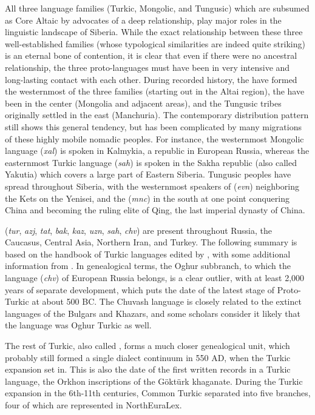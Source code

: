 All three language families (Turkic, Mongolic, and Tungusic) which are subsumed as Core Altaic by advocates of a deep relationship, play major roles in the linguistic landscape of Siberia. While the exact relationship between these three well-established families (whose typological similarities are indeed quite striking) is an eternal bone of contention, it is clear that even if there were no ancestral relationship, the three proto-languages must have been in very intensive and long-lasting contact with each other. During recorded history, the  have formed the westernmost of the three families (starting out in the Altai region), the  have been in the center (Mongolia and adjacent areas), and the Tungusic tribes originally settled in the east (Manchuria). The contemporary distribution pattern still shows this general tendency, but has been complicated by many migrations of these highly mobile nomadic peoples. For
instance, the westernmost Mongolic language  (\textit{xal}) is spoken in Kalmykia, a republic in European Russia, whereas the easternmost Turkic language  (\textit{sah}) is spoken in the Sakha republic (also called Yakutia) which covers a large part of Eastern Siberia. Tungusic peoples have spread throughout Siberia, with the westernmost speakers of  (\textit{evn}) neighboring the Kets on the Yenisei, and the  (\textit{mnc}) in the south at one point conquering China and becoming the ruling elite of Qing, the last imperial dynasty of China.

 (\textit{tur}, \textit{azj}, \textit{tat}, \textit{bak}, \textit{kaz}, \textit{uzn}, \textit{sah}, \textit{chv}) are present throughout Russia, the Caucasus, Central Asia, Northern Iran, and Turkey. The following summary is based on the handbook of Turkic languages edited by \cite{johanson_csato_1998}, with some additional information from \cite{menges1995}. In genealogical terms, the Oghur subbranch, to which the  language (\textit{chv}) of European Russia belongs, is a clear outlier, with at least 2,000 years of separate development, which puts the date of the latest stage of Proto-Turkic at about 500 BC. The Chuvash language is closely related to the extinct languages of the Bulgars and Khazars, and some scholars consider it likely that the  language was Oghur Turkic as well.

The rest of Turkic, also called , forms a much closer genealogical unit,
which probably still formed a single dialect continuum in 550 AD, when the Turkic expansion set in. This is also the date of the first written records in a Turkic language, the Orkhon inscriptions of the G\"oktürk khaganate. During the Turkic expansion in the 6th-11th centuries, Common Turkic separated into five branches, four of which are represented in NorthEuraLex.


